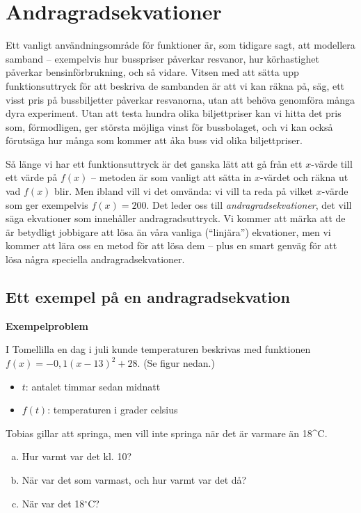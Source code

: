 \section{Andragradsekvationer}

Ett vanligt användningsområde för funktioner är, som tidigare sagt, att modellera samband -- exempelvis hur busspriser påverkar resvanor, hur körhastighet påverkar bensinförbrukning, och så vidare.
Vitsen med att sätta upp funktionsuttryck för att beskriva de sambanden är att vi kan räkna på, säg, ett visst pris på bussbiljetter påverkar resvanorna, utan att behöva genomföra många dyra experiment.
Utan att testa hundra olika biljettpriser kan vi hitta det pris som, förmodligen, ger största möjliga vinst för bussbolaget, och vi kan också förutsäga hur många som kommer att åka buss vid olika biljettpriser.

Så länge vi har ett funktionsuttryck är det ganska lätt att gå från ett $x$-värde till ett värde på $f(x)$ -- metoden är som vanligt att sätta in $x$-värdet och räkna ut vad $f(x)$ blir.
Men ibland vill vi det omvända: vi vill ta reda på vilket $x$-värde som ger exempelvis $f(x)=200$.
Det leder oss till \emph{andragradsekvationer}, det vill säga ekvationer som innehåller andragradsuttryck.
Vi kommer att märka att de är betydligt jobbigare att lösa än våra vanliga (``linjära'') ekvationer, men vi kommer att lära oss en metod för att lösa dem -- plus en smart genväg för att lösa några speciella andragradsekvationer.

\subsection{Ett exempel på en andragradsekvation}

\textbf{Exempelproblem}

I Tomellilla en dag i juli kunde temperaturen beskrivas med funktionen $f(x) = -0,1(x-13)^2+28$. (Se figur nedan.)
\begin{itemize}
  \item[] $t$: antalet timmar sedan midnatt
  \item[] $f(t)$: temperaturen i grader celsius
\end{itemize}

Tobias gillar att springa, men vill inte springa när det är varmare än 18^{\circ}C.

\begin{enumerate}[(a)]
  \item Hur varmt var det kl. 10?
  \item När var det som varmast, och hur varmt var det då?
  \item När var det 18$^{\circ}$C?
\end{enumerate}

